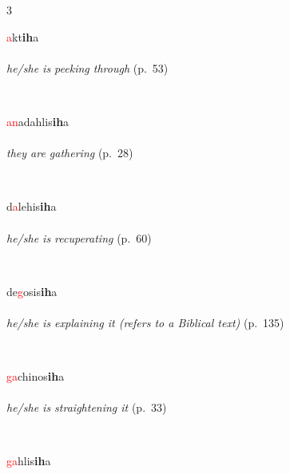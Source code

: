 \documentclass[oneside,openany]{book}%
\begin{document}
\noindent\begin{multicols}{3}%
\begin{minipage}[t]{\linewidth}
\raggedright\noindent \textcolor{Red}{a}kt\textbf{ih}a\\
\\
\noindent \textit{he/she is peeking through} (p.~53)
\end{minipage}\\[1em]%
\begin{minipage}[t]{\linewidth}
\raggedright\noindent \textcolor{Red}{an}adahlis\textbf{ih}a\\
\\
\noindent \textit{they are gathering} (p.~28)
\end{minipage}\\[1em]%
\begin{minipage}[t]{\linewidth}
\raggedright\noindent d\textcolor{Red}{a}lehis\textbf{ih}a\\
\\
\noindent \textit{he/she is recuperating} (p.~60)
\end{minipage}\\[1em]%
\begin{minipage}[t]{\linewidth}
\raggedright\noindent de\textcolor{Red}{g}osis\textbf{ih}a\\
\\
\noindent \textit{he/she is explaining it (refers to a Biblical text)} (p.~135)
\end{minipage}\\[1em]%
\begin{minipage}[t]{\linewidth}
\raggedright\noindent \textcolor{Red}{ga}chinos\textbf{ih}a\\
\\
\noindent \textit{he/she is straightening it} (p.~33)
\end{minipage}\\[1em]%
\begin{minipage}[t]{\linewidth}
\raggedright\noindent \textcolor{Red}{ga}hlis\textbf{ih}a\\

\end{minipage}
\end{multicols}
\end{document}
